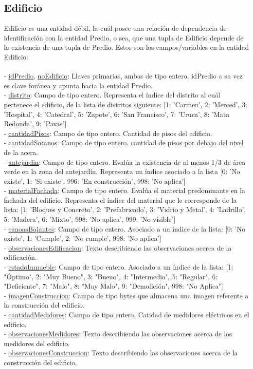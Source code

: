 \subsection{Edificio}
Edificio es una entidad débil, la cuál posee una relación de dependencia de identificación con la entidad Predio, o sea, que una tupla de Edificio depende de la existencia de una tupla de Predio.
Estos son los campos/variables en la entidad Edificio:\\\\
- \underline{idPredio}, \underline{noEdificio}: Llaves primarias, ambas de tipo entero. idPredio a su vez es clave foránea y apunta hacia la entidad Predio.\\
- \underline{distrito}: Campo de tipo entero. Representa el índice del distrito al cuál pertenece el edificio, de la lista de distritos siguiente: [1: 'Carmen', 2: 'Merced', 3: 'Hospital', 4: 'Catedral', 5: 'Zapote', 6: 'San Francisco', 7: 'Uruca', 8: 'Mata Redonda', 9: 'Pavas']\\
- \underline{cantidadPisos}: Campo de tipo entero. Cantidad de pisos del edificio.\\
- \underline{cantidadSotanos}: Campo de tipo entero. cantidad de pisos por debajo del nivel de la acera.\\
- \underline{antejardin}: Campo de tipo entero. Evalúa la existencia de al menos 1/3 de área verde en la zona del antejardín. Representa un índice asociado a la lista [0: 'No existe', 1: 'Si existe', 996: 'En construcción', 998: 'No aplica']\\
- \underline{materialFachada}: Campo de tipo entero. Evalúa el material predominante en la fachada del edificio. Representa el índice del material que le corresponde de la lista: [1: 'Bloques y Concreto', 2: 'Prefabricado', 3: 'Vidrio y Metal', 4: 'Ladrillo', 5: 'Madera', 6: 'Mixto', 998: 'No aplica', 999: 'No visible']\\
- \underline{canoasBajantes}: Campo de tipo entero. Asociado a un índice de la lista: [0: 'No existe', 1: 'Cumple', 2: 'No cumple', 998: 'No aplica']\\
- \underline{observacionesEdificacion}: Texto describiendo las observaciones acerca de la edificación.\\
- \underline{estadoInmueble}: Campo de tipo entero. Asociado a un índice de la lista: [1: "Óptimo", 2: "Muy Bueno", 3: "Bueno", 4: "Intermedio", 5: "Regular", 6: "Deficiente", 7: "Malo", 8: "Muy Malo", 9: "Demolición", 998: "No Aplica"]\\
- \underline{imagenConstruccion}: Campo de tipo bytes que almacena una imagen referente a la construcción del edificio.\\
- \underline{cantidadMedidores}: Campo de tipo entero. Catidad de medidores eléctricos en el edificio.\\
- \underline{observacionesMedidores}: Texto describiendo las observaciones acerca de los medidores del edificio.\\
- \underline{observacionesConstruccion}: Texto describiendo las observaciones acerca de la construcción del edificio.\\
